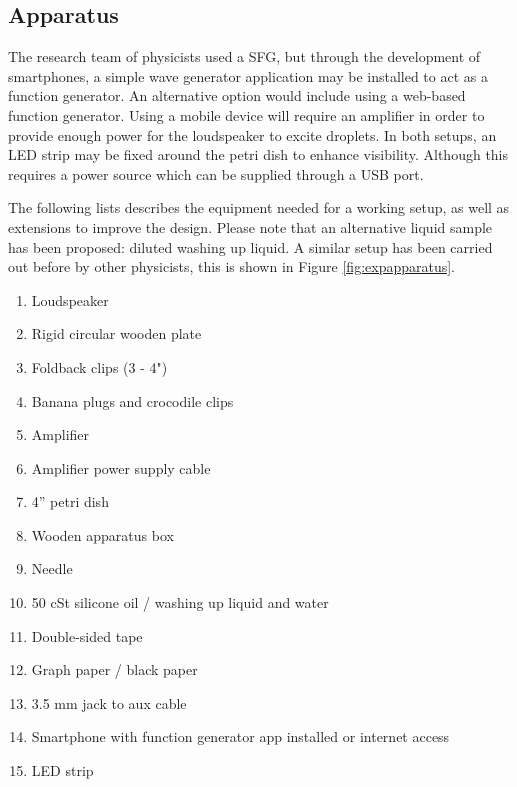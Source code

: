 \subsection{Apparatus}

The research team of physicists used a SFG, but through the development of smartphones, a simple wave generator application may be installed to act as a function generator. An alternative option would include using a web-based function generator. Using a mobile device will require an amplifier in order to provide enough power for the loudspeaker to excite droplets. In both setups, an LED strip may be fixed around the petri dish to enhance visibility. Although this requires a power source which can be supplied through a USB port. 

The following lists describes the equipment needed for a working setup, as well as extensions to improve the design. Please note that an alternative liquid sample has been proposed: diluted washing up liquid. A similar setup has been carried out before by other physicists, this is shown in Figure \ref {fig:expapparatus}.

\begin{enumerate}
\item  Loudspeaker

\item  Rigid circular wooden plate

\item  Foldback clips (3 - 4")

\item  Banana plugs and crocodile clips

\item  Amplifier

\item  Amplifier power supply cable

\item  4'' petri dish

\item  Wooden apparatus box

\item  Needle

\item  50 cSt silicone oil / washing up liquid  and water

\item  Double-sided tape

\item  Graph paper / black paper

\item  3.5 mm jack to aux cable

\item  Smartphone with function generator app installed or internet access

\item  LED strip

\end{enumerate}

